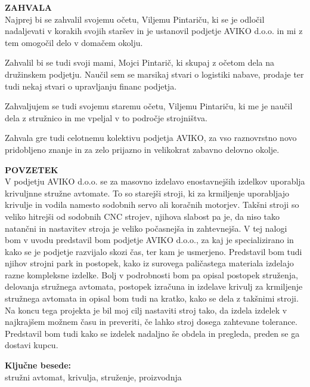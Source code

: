 \newpage
\textbf{\fontsize{14}{21}\selectfont ZAHVALA} \\
Najprej bi se zahvalil svojemu očetu, Viljemu Pintariču,
ki se je odločil nadaljevati v korakih svojih staršev in 
je ustanovil podjetje AVIKO d.o.o. in mi z tem omogočil delo
v domačem okolju.

Zahvalil bi se tudi svoji mami, Mojci Pintarič, ki skupaj z očetom
dela na družinskem podjetju. Naučil sem se marsikaj stvari o 
logistiki nabave, prodaje ter tudi nekaj stvari o upravljanju
financ podjetja.

Zahvaljujem se tudi svojemu staremu očetu, Viljemu Pintariču,
ki me je naučil dela z stružnico in me vpeljal v to področje strojništva.

Zahvala gre tudi celotnemu kolektivu podjetja AVIKO, za vso
raznovrstno novo pridobljeno znanje in za zelo prijazno in velikokrat
zabavno delovno okolje.

\newpage
\textbf{\fontsize{14}{21}\selectfont POVZETEK} \\
V podjetju AVIKO d.o.o. se za masovno izdelavo enostavnejših 
izdelkov uporablja krivuljnne stružne avtomate. To so starejši 
stroji, ki za krmiljenje uporabljajo krivulje in vodila namesto 
sodobnih servo ali koračnih motorjev. Takšni stroji so veliko 
hitrejši od sodobnih CNC strojev, njihova slabost pa je, da niso 
tako natančni in nastavitev stroja je veliko počasnejša in zahtevnejša.
V tej nalogi bom v uvodu predstavil bom podjetje AVIKO d.o.o., 
za kaj je specializirano in kako se je podjetje razvijalo skozi 
čas, ter kam je usmerjeno. Predstavil bom tudi njihov strojni 
park in postopek, kako iz surovega paličastega materiala 
izdelajo razne kompleksne izdelke.
Bolj v podrobnosti bom pa opisal postopek struženja, delovanja
stružnega avtomata, postopek
izračuna in izdelave krivulj za krmiljenje stružnega avtomata in opisal
bom tudi na kratko, kako se dela z takšnimi stroji.
Na koncu tega projekta je bil moj cilj
nastaviti stroj tako, da izdela 
izdelek v najkrajšem možnem času in preveriti, če lahko stroj
dosega zahtevane tolerance. Predstavil bom tudi kako se
izdelek nadaljno še obdela in pregleda, preden se ga dostavi kupcu.

\textbf{\fontsize{14}{21}\selectfont Ključne besede:} \\
\fontsize{12}{16}stružni avtomat, krivulja, struženje, proizvodnja

